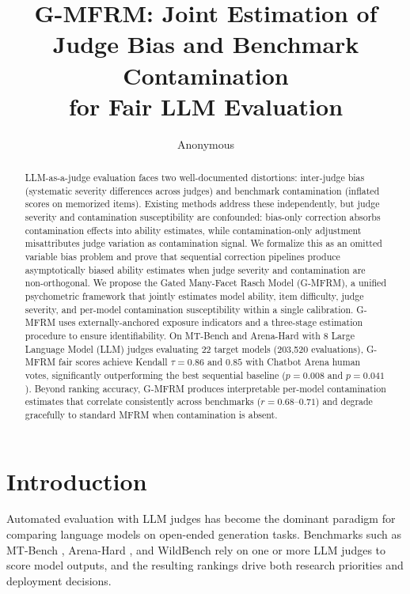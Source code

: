 \documentclass[11pt]{article}
\title{G-MFRM: Joint Estimation of Judge Bias and Benchmark Contamination\\for Fair LLM Evaluation}
\author{Anonymous}
\date{}
\begin{document}
\maketitle

\begin{abstract}
LLM-as-a-judge evaluation faces two well-documented distortions: inter-judge bias (systematic severity differences across judges) and benchmark contamination (inflated scores on memorized items). Existing methods address these independently, but judge severity and contamination susceptibility are confounded: bias-only correction absorbs contamination effects into ability estimates, while contamination-only adjustment misattributes judge variation as contamination signal. We formalize this as an omitted variable bias problem and prove that sequential correction pipelines produce asymptotically biased ability estimates when judge severity and contamination are non-orthogonal. We propose the Gated Many-Facet Rasch Model (G-MFRM), a unified psychometric framework that jointly estimates model ability, item difficulty, judge severity, and per-model contamination susceptibility within a single calibration. G-MFRM uses externally-anchored exposure indicators and a three-stage estimation procedure to ensure identifiability.
On MT-Bench and Arena-Hard with 8 Large Language Model (LLM) judges evaluating 22 target models (203,520 evaluations), G-MFRM fair scores achieve Kendall $\tau = 0.86$ and $0.85$ with Chatbot Arena human votes, significantly outperforming the best sequential baseline ($p = 0.008$ and $p = 0.041$). Beyond ranking accuracy, G-MFRM produces interpretable per-model contamination estimates that correlate consistently across benchmarks ($r = 0.68$--$0.71$) and degrade gracefully to standard MFRM when contamination is absent.
\end{abstract}

\section{Introduction}

Automated evaluation with LLM judges has become the dominant paradigm for comparing language models on open-ended generation tasks. Benchmarks such as MT-Bench \citep{zheng2023judging}, Arena-Hard \citep{li2024crowdsourced}, and WildBench \citep{lin2024wildbench} rely on one or more LLM judges to score model outputs, and the resulting rankings drive both research priorities and deployment decisions.
\end{document}
